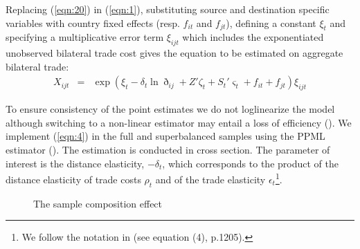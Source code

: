 \documentclass[12pt,twoside,a4paper,notitlepage]{article}
\begin{document}
Replacing (\ref{eqn:20}) in (\ref{eqn:1}), substituting source and destination specific variables with country fixed effects (resp. $f_{it}$ and $f_{jt}$), defining a constant $\xi_t$ and specifying a multiplicative error term $\xi_{ijt}$ which includes the exponentiated unobserved bilateral trade cost gives the equation to be estimated on aggregate bilateral trade: 
\begin{eqnarray}
X_{ijt}&=&\exp{\left(\xi_t-\delta_{t}\ln{\eth_{ij}}+{Z}'\zeta_t+{S_t}'\varsigma_t+f_{it}+f_{jt}\right)\xi_{ijt}} \label{eqn:4}
\end{eqnarray}

To ensure consistency of the point estimates we do not loglinearize the model although switching to a non-linear estimator may entail a loss of efficiency (\cite{Manning1999}). We implement (\ref{eqn:4}) in the full and superbalanced samples using the PPML estimator (\cite{Silva2006}). The estimation is conducted in cross section. The parameter of interest is the distance elasticity, $-\delta_t$, which corresponds to the product of the distance elasticity of trade costs $\rho_t$ and of the trade elasticity $\epsilon_t$\footnote{We follow the notation in \cite{Head2013} (see equation (4), p.1205).}. 

\begin{figure}[h!]
\caption{The sample composition effect \label{fig:compsample}}
\begin{center}
\setlength{\fboxrule}{1pt} %
\setlength{\fboxsep}{.1in} %
\end{center}
\end{figure}
\end{document}
